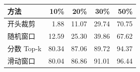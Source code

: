 \begin{tabular}{lrrrr}
\toprule
方法 & 10\% & 20\% & 30\% & 50\%\\

\midrule
开头裁剪 & 1.88 & 11.07 & 29.74 & 70.75\\
随机窗口 & 12.59 & 25.30 & 39.86 & 67.62\\
分数 Top-k & 80.34 & 87.06 & 89.72 & 94.37\\
滑动窗口 & 80.04 & 86.86 & 91.01 & 96.44\\
\bottomrule
\end{tabular}

